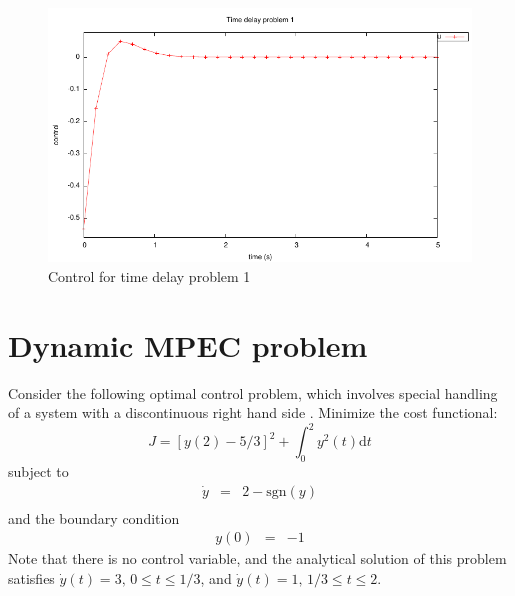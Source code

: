 \documentclass[a4paper,11pt]{report}    %
\begin{document}
\begin{figure}
  \centering
  \includegraphics{../examples/delay1/delay1_controls}
  \caption{Control for time delay problem 1}
 \label{fig:delay1_controls}
\end{figure}

\section{Dynamic MPEC problem}

Consider the following optimal control problem, which involves special
handling of a system with a discontinuous right hand side \cite{Betts:10}.  
Minimize the cost functional:
\begin{equation}
  J = \left[ y(2)- 5/3\right]^2 + \int_0^2 y^2(t) \mathrm{d}t
\end{equation}
subject to 
\begin{equation}
  \begin{array}{lcl}
    \dot y & = & 2 - \mathrm{sgn}(y) \\
  \end{array}
\end{equation}
and the boundary condition
\begin{equation}
  \begin{array}{lcl}
    y(0) & = & -1 
  \end{array}
\end{equation}
Note that there is no control variable, and the analytical solution of this problem satisfies $\dot{y}(t)=3, \, 0 \le t \le 1/3$,
and $\dot{y}(t)=1, \, 1/3 \le t \le 2$.
\end{document}
